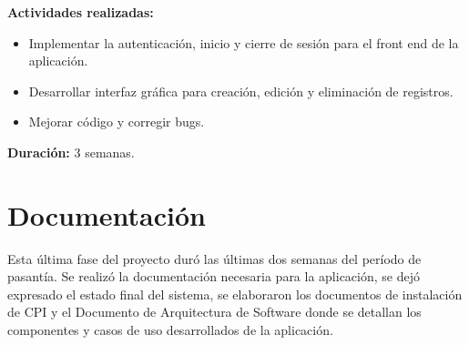 \textbf{Actividades realizadas:}
\begin{itemize}
   \item Implementar la autenticación, inicio y cierre de sesión para el front end de la aplicación.
   \item Desarrollar interfaz gráfica para creación, edición y eliminación de registros.
   \item Mejorar código y corregir bugs.
\end{itemize}

\textbf{Duración:} 3 semanas.


\section{Documentación} \label{documentation}
Esta última fase del proyecto duró las últimas dos semanas del período de pasantía. Se realizó la documentación necesaria para la aplicación, se dejó expresado el estado final del sistema, se elaboraron los documentos de instalación de CPI y el Documento de Arquitectura de Software donde se detallan los componentes y casos de uso desarrollados de la aplicación.
